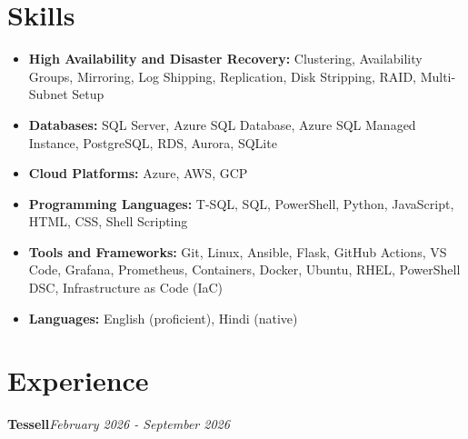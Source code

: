 \documentclass[10pt,a4paper]{article}
\begin{document}
\section{Skills}
\begin{itemize}
  \item \textbf{High Availability and Disaster Recovery:} Clustering, Availability Groups, Mirroring, Log Shipping, Replication, Disk Stripping, RAID, Multi-Subnet Setup
  \item \textbf{Databases:} SQL Server, Azure SQL Database, Azure SQL Managed Instance, PostgreSQL, RDS, Aurora, SQLite
  \item \textbf{Cloud Platforms:} Azure, AWS, GCP
  \item \textbf{Programming Languages:} T-SQL, SQL, PowerShell, Python, JavaScript, HTML, CSS, Shell Scripting
  \item \textbf{Tools and Frameworks:} Git, Linux, Ansible, Flask, GitHub Actions, VS Code, Grafana, Prometheus, Containers, Docker, Ubuntu, RHEL, PowerShell DSC, Infrastructure as Code (IaC)
  \item \textbf{Languages:} English (proficient), Hindi (native)
\end{itemize}

\section{Experience}

\noindent\textbf{Tessell}\hfill \textit{February 2026 - September 2026}
\end{document}
